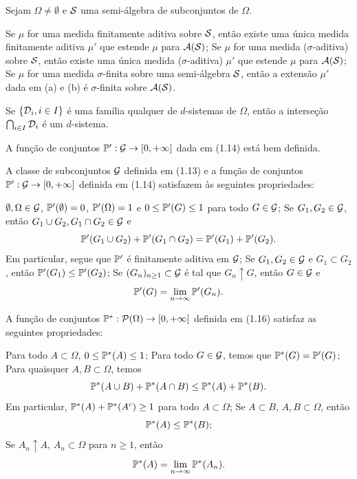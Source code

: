 \begin{theorem}
	Sejam $\Omega \neq \emptyset$ e $\Scal$ uma semi-álgebra de subconjuntos de $\Omega$.
	\begin{outline}[enumerate]
		\1 Se $\mu$ for uma medida finitamente aditiva sobre $\Scal$, então existe uma única medida finitamente aditiva $\mu'$ que estende $\mu$ para $\Acal(\Scal)$;
		\1 Se $\mu$ for uma medida ($\sigma$-aditiva) sobre $\Scal$, então existe uma única medida ($\sigma$-aditiva) $\mu'$ que estende $\mu$ para $\Acal(\Scal)$;
		\1 Se $\mu$ for uma medida $\sigma$-finita sobre uma semi-álgebra $\Scal$, então a extensão $\mu'$ dada em (a) e (b) é $\sigma$-finita sobre $\Acal(\Scal)$.
	\end{outline}
\end{theorem}

\begin{theorem}
	Se $\{\Dcal_i, i \in I\}$ é uma família qualquer de $d$-sistemas de $\Omega$, então a interseção $\bigcap_{i \in I} \Dcal_i$ é um $d$-sistema.
\end{theorem}

\begin{theorem}
	A função de conjuntos $\P' : \Gcal \to [0, +\infty]$ dada em (1.14) está bem definida.
\end{theorem}

\begin{theorem}
	A classe de subconjuntos $\Gcal$ definida em (1.13) e a função de conjuntos $\P' : \Gcal \to [0, +\infty]$ definida em (1.14) satisfazem às seguintes propriedades:
	\begin{outline}[enumerate]
		\1 $\emptyset, \Omega \in \Gcal$, $\P'(\emptyset) = 0$, $\P'(\Omega) = 1$ e $0 \leq \P'(G) \leq 1$ para todo $G \in \Gcal$;
		\1 Se $G_1, G_2 \in \Gcal$, então $G_1 \cup G_2, G_1 \cap G_2 \in \Gcal$ e
		\[
		\P'(G_1 \cup G_2) + \P'(G_1 \cap G_2) = \P'(G_1) + \P'(G_2).
		\]
		Em particular, segue que $\P'$ é finitamente aditiva em $\Gcal$;
		\1 Se $G_1, G_2 \in \Gcal$ e $G_1 \subset G_2$, então $\P'(G_1) \leq \P'(G_2)$;
		\1 Se $(G_n)_{n\geq 1} \subset \Gcal$ é tal que $G_n \uparrow G$, então $G \in \Gcal$ e
		\[
		\P'(G) = \lim_{n \to \infty} \P'(G_n).
		\]
	\end{outline}
\end{theorem}

\begin{theorem}
	A função de conjuntos $\P^* : \Pcal(\Omega) \to [0, +\infty]$ definida em (1.16) satisfaz as seguintes propriedades:
	\begin{outline}[enumerate]
		\1 Para todo $A \subset \Omega$, $0 \leq \P^*(A) \leq 1$;
		\1 Para todo $G \in \Gcal$, temos que $\P^*(G) = \P'(G)$;
		\1 Para quaisquer $A, B \subset \Omega$, temos
		\[
		\P^*(A \cup B) + \P^*(A \cap B) \leq \P^*(A) + \P^*(B).
		\]
		Em particular, $\P^*(A) + \P^*(A^c) \geq 1$ para todo $A \subset \Omega$;
		\1 Se $A \subset B$, $A, B \subset \Omega$, então
		\[
		\P^*(A) \leq \P^*(B);
		\]
		\1 Se $A_n \uparrow A$, $A_n \subset \Omega$ para $n \geq 1$, então
		\[
		\P^*(A) = \lim_{n \to \infty} \P^*(A_n).
		\]
	\end{outline}
\end{theorem}

